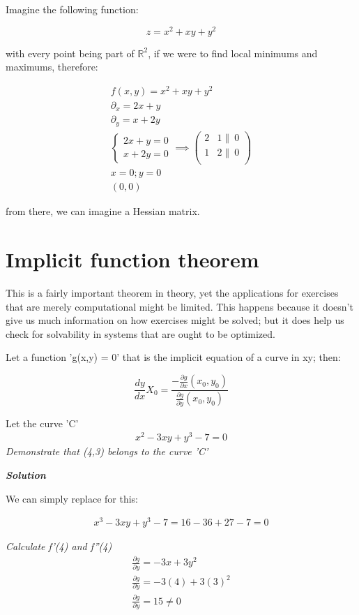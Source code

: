\documentclass[11pt,fleqn]{book} %
\begin{document}
Imagine the following function:

$$ z =  x^2 + xy + y^2 $$

with every point being part of $\mathbb{R}^2$, if we were to find local minimums and maximums,
therefore:

\begin{gather}
    f(x,y) =  x^2 + xy + y^2 \\
    \partial_x = 2x + y\\
    \partial_y = x + 2y\\
    \begin{cases}
        2x + y = 0\\
        x + 2y = 0
    \end{cases}
    \implies \begin{pmatrix}
        2 & 1 \|\ 0\\
        1 & 2 \|\ 0\\
    \end{pmatrix}\\
    x=0 ; y=0\\
    (0,0)
\end{gather}

from there, we can imagine a Hessian matrix.



\section{Implicit function theorem}

This is a fairly important theorem in theory, yet the applications for exercises that are merely computational might be limited. This happens because it doesn't
give us much information on how exercises might be solved; but it does help us check for solvability in systems that are ought to be optimized.

Let a function 'g(x,y) = 0' that is the implicit equation of a curve in xy;
then:

$$\frac{dy}{dx} X_0 = \frac{- \frac{\partial g}{\partial x} (x_0, y_0)}{\frac{\partial g}{\partial y} (x_0, y_0)}$$

\begin{example}
    Let the curve 'C'
    \begin{gather}
        x^2 - 3xy + y^3 -7 = 0 
    \end{gather}
    \textit{Demonstrate that (4,3) belongs to the curve 'C'}

    \textit{\textbf{Solution}}

    We can simply replace for this:

    \begin{gather}
        x^3 - 3xy + y^3 -7 = 16 - 36 + 27 - 7 = 0
    \end{gather}

    \textit{Calculate f'(4) and f''(4)}
    \begin{gather}
        \frac{\partial g}{\partial y} = -3x + 3y^2\\
        \frac{\partial g}{\partial y} = -3(4) + 3(3)^2\\
        \frac{\partial g}{\partial y} = 15 \neq 0
    \end{gather}
\end{example}
\end{document}
